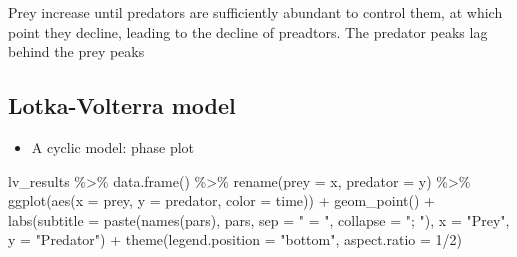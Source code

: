 \documentclass[
  letterpaper,
  DIV=11,
  numbers=noendperiod]{scrartcl}
\newenvironment{Shaded}{\begin{snugshade}}{\end{snugshade}}
\newcommand{\AttributeTok}[1]{\textcolor[rgb]{0.40,0.45,0.13}{#1}}
\newcommand{\DecValTok}[1]{\textcolor[rgb]{0.68,0.00,0.00}{#1}}
\newcommand{\FunctionTok}[1]{\textcolor[rgb]{0.28,0.35,0.67}{#1}}
\newcommand{\NormalTok}[1]{\textcolor[rgb]{0.00,0.23,0.31}{#1}}
\newcommand{\SpecialCharTok}[1]{\textcolor[rgb]{0.37,0.37,0.37}{#1}}
\newcommand{\StringTok}[1]{\textcolor[rgb]{0.13,0.47,0.30}{#1}}
\providecommand{\tightlist}{%
  \setlength{\itemsep}{0pt}\setlength{\parskip}{0pt}}\usepackage{longtable,booktabs,array}
\begin{document}
Prey increase until predators are sufficiently abundant to control them,
at which point they decline, leading to the decline of preadtors. The
predator peaks lag behind the prey peaks

\hypertarget{lotka-volterra-model-4}{%
\subsection{Lotka-Volterra model}\label{lotka-volterra-model-4}}

\begin{itemize}
\tightlist
\item
  A cyclic model: phase plot
\end{itemize}

\begin{Shaded}
\begin{Highlighting}[]
\NormalTok{lv\_results }\SpecialCharTok{\%\textgreater{}\%} 
  \FunctionTok{data.frame}\NormalTok{() }\SpecialCharTok{\%\textgreater{}\%} 
  \FunctionTok{rename}\NormalTok{(}\AttributeTok{prey =}\NormalTok{ x, }\AttributeTok{predator =}\NormalTok{ y) }\SpecialCharTok{\%\textgreater{}\%} 
  \FunctionTok{ggplot}\NormalTok{(}\FunctionTok{aes}\NormalTok{(}\AttributeTok{x =}\NormalTok{ prey, }\AttributeTok{y =}\NormalTok{ predator, }\AttributeTok{color =}\NormalTok{ time)) }\SpecialCharTok{+}
    \FunctionTok{geom\_point}\NormalTok{() }\SpecialCharTok{+}
    \FunctionTok{labs}\NormalTok{(}\AttributeTok{subtitle =} \FunctionTok{paste}\NormalTok{(}\FunctionTok{names}\NormalTok{(pars), pars, }\AttributeTok{sep =} \StringTok{" = "}\NormalTok{, }\AttributeTok{collapse =} \StringTok{"; "}\NormalTok{),}
         \AttributeTok{x =} \StringTok{"Prey"}\NormalTok{, }\AttributeTok{y =} \StringTok{"Predator"}\NormalTok{) }\SpecialCharTok{+} 
    \FunctionTok{theme}\NormalTok{(}\AttributeTok{legend.position =} \StringTok{"bottom"}\NormalTok{,}
          \AttributeTok{aspect.ratio =} \DecValTok{1}\SpecialCharTok{/}\DecValTok{2}\NormalTok{)}
\end{Highlighting}
\end{Shaded}
\end{document}
